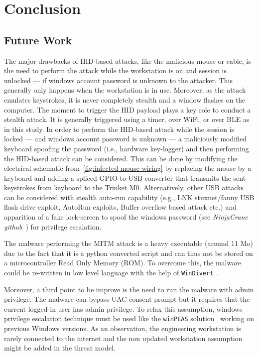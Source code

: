 \chapter{Conclusion}

\section{Future Work}

The major drawbacks of HID-based attacks, like the malicious mouse or cable, is the need to perform the attack while the workstation is on and session is unlocked — if windows account password is unknown to the attacker. This generally only happens when the workstation is in use. Moreover, as the attack emulates keystrokes, it is never completely stealth and a window flashes on the computer. The moment to trigger the HID payload plays a key role to conduct a stealth attack. It is generally triggered using a timer, over WiFi, or over BLE as in this study. In order to perform the HID-based attack while the session is locked — and windows account password is unknown — a maliciously modified keyboard spoofing the password (i.e., hardware key-logger) and then performing the HID-based attack can be considered. This can be done by modifying the electrical schematic from~\autoref{fig:infected-mouse-wiring} by replacing the mouse by a keyboard and adding a spliced GPIO-to-USB converter that transmits the sent keystrokes from keyboard to the Trinket M0. Alternatively, other USB attacks can be considered with stealth auto-run capability (e.g.,  LNK stuxnet/fanny USB flash drive exploit,  AutoRun exploits, Buffer overflow based attack etc.) and apparition of a fake lock-screen to spoof the windows password (see \emph{NinjaCrane github}~\cite{MyGithub}) for privilege escalation. 

The malware performing the MITM attack is a heavy executable (around 11 Mo) due to the fact that it is a python converted script and can thus not be stored on a microcontroller Read Only Memory (ROM). To overcome this, the malware could be re-written in low level language with the help of \texttt{WinDivert}~\cite{windivert}. 

Moreover, a third point to be improve is the need to run the malware with admin privilege. The malware can bypass UAC consent prompt but it requires that the current logged-in user has admin privilege. To relax this assumption, windows privilege escalation technique must be used like the \texttt{winPEAS} solution~\cite{winpeass} working on previous Windows versions. As an observation, the engineering workstation is rarely connected to the internet and the non updated workstation assumption might be added in the threat model.

